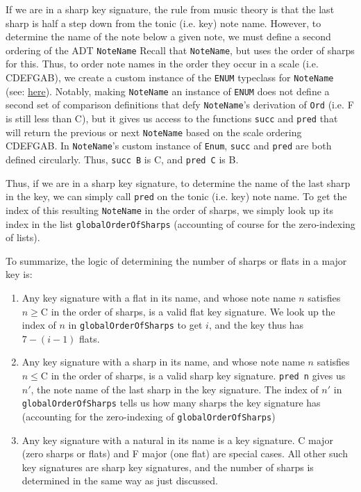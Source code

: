 \documentclass{report}
\begin{document}
If we are in a sharp key signature, the rule from music theory is that the last sharp is half a step down from the tonic (i.e. key) note name. However, to determine the name of the note below a given note, we must define a second ordering of the ADT \verb.NoteName. Recall that \verb.NoteName., but uses the order of sharps for this. Thus, to order note names in the order they occur in a scale (i.e. CDEFGAB), we create a custom instance of the \verb.ENUM. typeclass for \verb.NoteName. (see: \href{https://github.com/ilanashapiro/MusAssist/blob/main/app/MusAssistAST.hs#L21}{here}). Notably, making \verb.NoteName. an instance of \verb.ENUM. does not define a second set of comparison definitions that defy \verb.NoteName.'s derivation of \verb.Ord. (i.e. F is still less than C), but it gives us access to the functions \verb.succ. and \verb.pred. that will return the previous or next \verb.NoteName. based on the scale ordering CDEFGAB. In \verb.NoteName.'s custom instance of \verb.Enum., \verb.succ. and \verb.pred. are both defined circularly. Thus, \verb.succ B. is C, and \verb.pred C. is B.

Thus, if we are in a sharp key signature, to determine the name of the last sharp in the key, we can simply call \verb.pred. on the tonic (i.e. key) note name. To get the index of this resulting \verb.NoteName. in the order of sharps, we simply look up its index in the list \verb.globalOrderOfSharps. (accounting of course for the zero-indexing of lists).

To summarize, the logic of determining the number of sharps or flats in a major key is:
\begin{enumerate}
\item Any key  signature with a flat in its name, and whose note name $n$ satisfies $n \geq $\;C in the order of sharps, is a valid flat key signature. We look up the index of $n$ in \verb.globalOrderOfSharps. to get $i$, and the key thus has $7-(i-1)$ flats.
\item Any key  signature with a sharp in its name, and whose note name $n$ satisfies $n \leq $\;C in the order of sharps, is a valid sharp key signature. \verb.pred n. gives us $n'$, the note name of the last sharp in the key signature. The index of $n'$ in \verb.globalOrderOfSharps. tells us how many sharps the key signature has (accounting for the zero-indexing of \verb.globalOrderOfSharps.)

\item Any key  signature with a natural in its name is a key signature. C major (zero sharps or flats) and F major (one flat) are special cases. All other such key signatures are sharp key signatures, and the number of sharps is determined in the same way as just discussed.
\end{enumerate}
\end{document}
